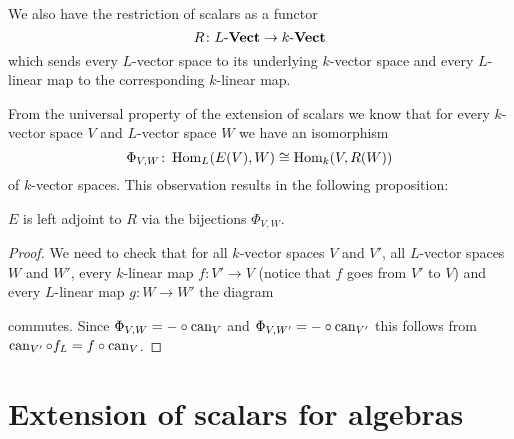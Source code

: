 We also have the restriction of scalars as a functor
\[
  R \colon L\text{-}\mathbf{Vect} \to k\text{-}\mathbf{Vect}
\]
which sends every $L$-vector space to its underlying $k$-vector space and every $L$-linear map to the corresponding $k$-linear map.
  
From the universal property of the extension of scalars we know that for every $k$-vector space $V$ and $L$-vector space $W$ we have an isomorphism
\[
          \Phi_{V,W}
  \colon  \operatorname{Hom}_L(E(V),W)
  \cong   \operatorname{Hom}_k(V,R(W))
\]
of $k$-vector spaces.
This observation results in the following proposition:
  
\begin{prop}
  $E$ is left adjoint to $R$ via the bijections $\Phi_{V,W}$.
\end{prop}
\begin{proof}
  We need to check that for all $k$-vector spaces $V$ and $V'$, all $L$-vector spaces $W$ and $W'$, every $k$-linear map $f \colon V' \to V$ (notice that $f$ goes from $V'$ to $V$) and every $L$-linear map $g \colon W \to W'$ the diagram
  \begin{center}
  \end{center}
  commutes.
  Since $\Phi_{V,W} = - \circ \operatorname{can}_V$ and $\Phi_{V,W'} = - \circ \operatorname{can}_{V'}$ this follows from $\operatorname{can}_{V'} \circ f_L = f \circ \operatorname{can}_V$.
\end{proof}





\section{Extension of scalars for algebras}


